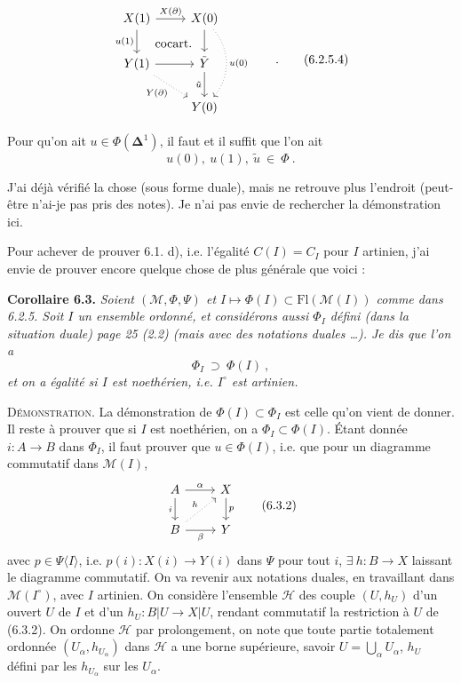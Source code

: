 \documentclass[11pt]{article}
\newcommand{\printedpage}[1]{\marginpar{\footnotesize p.~#1}}
\newcommand{\msp}[1]{\marginpar{\footnotesize [#1]}}
\begin{document}
\noindent\printedpage{54}\msp{page 108}
\[
\begin{tikzcd}
X(1) \arrow[r, "X(\partial)"] \arrow[d, "u(1)"'] \arrow[dr, phantom, "\text{cocart.}"] & X(0) \arrow[d] \arrow[dd, dotted, bend left=40, "u(0)"] \\
Y(1) \arrow[r] \arrow[dr, dotted, "Y(\partial)"'] & \tilde{Y} \arrow[d, "\tilde{u}"'] \\
 & Y(0)
\end{tikzcd}
\qquad .
\tag*{(6.2.5.4)}
\]

Pour qu'on ait $u \in \Phi(\boldsymbol{\Delta}^1)$, il faut et il suffit que l'on ait
\[
u(0),\ u(1),\ \tilde{u} \ \in\ \Phi\ .
\tag*{(6.2.5.5)}
\]

J'ai déjà vérifié la chose (sous forme duale), mais ne retrouve plus l'endroit (peut-être n'ai-je pas pris des notes). Je n'ai pas envie de rechercher la démonstration ici.

Pour achever de prouver 6.1. d), i.e. l'égalité $C(I) = C_I$ pour $I$ artinien, j'ai envie de prouver encore quelque chose de plus générale que voici : %

\textbf{Corollaire 6.3.} \textit{Soient $(\mathcal{M}, \Phi, \Psi)$ et $I \longmapsto \Phi(I) \subset \mathrm{Fl}(\mathcal{M}(I))$ comme dans \textup{6.2.5.} Soit $I$ un ensemble ordonné, et considérons aussi $\Phi_I$ défini (dans la situation duale) page \textup{25 (2.2)} (mais avec des notations duales \dots). Je dis que l'on a}
\[
\Phi_I \ \supset\ \Phi(I)\ ,
\tag*{(6.3.1)}
\]
\msp{page 109}\textit{et on a égalité si $I$ est noethérien, i.e. $I^{\circ}$ est artinien.}

\textsc{Démonstration}. La démonstration de $\Phi(I) \subset \Phi_I$ est celle qu'on vient de donner. Il reste à prouver que si $I$ est noethérien, on a $\Phi_I \subset \Phi(I)$. Étant donnée $i : A \longrightarrow B$ dans $\Phi_I$, il faut prouver que $u \in \Phi(I)$, %
i.e. que pour un diagramme commutatif dans $\mathcal{M}(I)$,
\[
\begin{tikzcd}
A \arrow[r, "\alpha"] \arrow[d, "i"'] & X \arrow[d, "p"] \\
B \arrow[r, "\beta"'] \arrow[ur, dotted, "h"] & Y
\end{tikzcd}
\tag*{(6.3.2)}
\]
avec $p \in \Psi\langle I\rangle$, i.e. $p(i) : X(i) \longrightarrow Y(i)$ dans $\Psi$ pour tout $i$, $\exists\ h : B \longrightarrow X$ laissant le diagramme commutatif. On va revenir aux notations duales, en travaillant dans $\mathcal{M}(I^{\circ})$, avec $I$ artinien. On considère l'ensemble $\mathcal{H}$ des couple %
$(U, h_U)$ d'un ouvert $U$ de $I$ et d'un $h_U : B|U \longrightarrow X|U$, rendant commutatif la restriction à $U$ de (6.3.2). %
On ordonne $\mathcal{H}$ par prolongement, on note que toute partie totalement ordonnée $(U_\alpha, h_{U_\alpha})$ dans $\mathcal{H}$ a une borne supérieure, savoir $U = \bigcup_\alpha U_\alpha$, $h_U$ défini par les $h_{U_\alpha}$ sur les $U_\alpha$.
\end{document}
